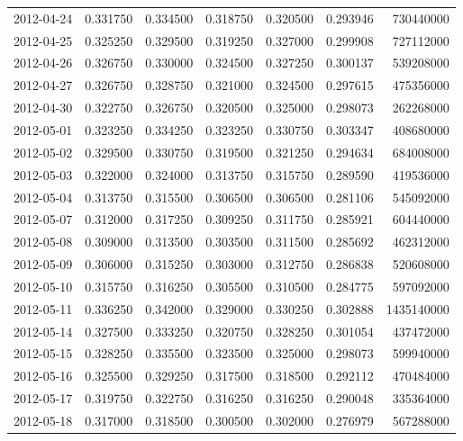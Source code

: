\begin{tabular}{lrrrrrr}
2012-04-24 &    0.331750 &    0.334500 &    0.318750 &    0.320500 &    0.293946 &   730440000 \\
2012-04-25 &    0.325250 &    0.329500 &    0.319250 &    0.327000 &    0.299908 &   727112000 \\
2012-04-26 &    0.326750 &    0.330000 &    0.324500 &    0.327250 &    0.300137 &   539208000 \\
2012-04-27 &    0.326750 &    0.328750 &    0.321000 &    0.324500 &    0.297615 &   475356000 \\
2012-04-30 &    0.322750 &    0.326750 &    0.320500 &    0.325000 &    0.298073 &   262268000 \\
2012-05-01 &    0.323250 &    0.334250 &    0.323250 &    0.330750 &    0.303347 &   408680000 \\
2012-05-02 &    0.329500 &    0.330750 &    0.319500 &    0.321250 &    0.294634 &   684008000 \\
2012-05-03 &    0.322000 &    0.324000 &    0.313750 &    0.315750 &    0.289590 &   419536000 \\
2012-05-04 &    0.313750 &    0.315500 &    0.306500 &    0.306500 &    0.281106 &   545092000 \\
2012-05-07 &    0.312000 &    0.317250 &    0.309250 &    0.311750 &    0.285921 &   604440000 \\
2012-05-08 &    0.309000 &    0.313500 &    0.303500 &    0.311500 &    0.285692 &   462312000 \\
2012-05-09 &    0.306000 &    0.315250 &    0.303000 &    0.312750 &    0.286838 &   520608000 \\
2012-05-10 &    0.315750 &    0.316250 &    0.305500 &    0.310500 &    0.284775 &   597092000 \\
2012-05-11 &    0.336250 &    0.342000 &    0.329000 &    0.330250 &    0.302888 &  1435140000 \\
2012-05-14 &    0.327500 &    0.333250 &    0.320750 &    0.328250 &    0.301054 &   437472000 \\
2012-05-15 &    0.328250 &    0.335500 &    0.323500 &    0.325000 &    0.298073 &   599940000 \\
2012-05-16 &    0.325500 &    0.329250 &    0.317500 &    0.318500 &    0.292112 &   470484000 \\
2012-05-17 &    0.319750 &    0.322750 &    0.316250 &    0.316250 &    0.290048 &   335364000 \\
2012-05-18 &    0.317000 &    0.318500 &    0.300500 &    0.302000 &    0.276979 &   567288000 \\

\end{tabular}
